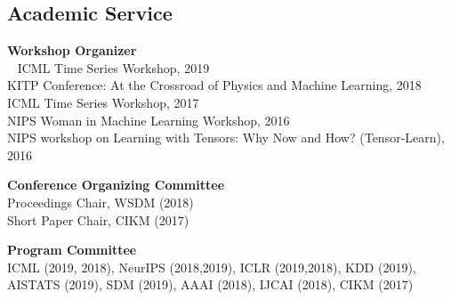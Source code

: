 \documentclass[margin,line]{res}
\begin{document}
\begin{resume}
\section{\sc Academic Service}
{\bf Workshop Organizer}\\\
\vspace{-1mm}
ICML Time Series  Workshop, 2019 \\
KITP Conference: At the Crossroad of Physics and Machine Learning, 2018\\
ICML Time Series  Workshop, 2017 \\
NIPS Woman in Machine Learning Workshop, 2016 \\
NIPS workshop on Learning with Tensors: Why Now and How? (Tensor-Learn), 2016 

{\bf Conference Organizing Committee}\\
\vspace{-1mm}
Proceedings Chair, WSDM (2018)\\
Short Paper Chair, CIKM (2017)

{\bf Program Committee}\\
\vspace{-1mm}
ICML (2019, 2018),  NeurIPS (2018,2019),  ICLR (2019,2018), KDD (2019), AISTATS (2019), SDM (2019), AAAI (2018), IJCAI (2018), CIKM (2017)



%




%



\end{resume}
\end{document}
